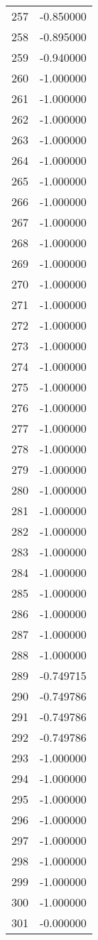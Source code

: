 \documentclass[12pt]{article}
\begin{document}
\begin{longtable}{@{}cc@{}}
257 & -0.850000 \\
258 & -0.895000 \\
259 & -0.940000 \\
260 & -1.000000 \\
261 & -1.000000 \\
262 & -1.000000 \\
263 & -1.000000 \\
264 & -1.000000 \\
265 & -1.000000 \\
266 & -1.000000 \\
267 & -1.000000 \\
268 & -1.000000 \\
269 & -1.000000 \\
270 & -1.000000 \\
271 & -1.000000 \\
272 & -1.000000 \\
273 & -1.000000 \\
274 & -1.000000 \\
275 & -1.000000 \\
276 & -1.000000 \\
277 & -1.000000 \\
278 & -1.000000 \\
279 & -1.000000 \\
280 & -1.000000 \\
281 & -1.000000 \\
282 & -1.000000 \\
283 & -1.000000 \\
284 & -1.000000 \\
285 & -1.000000 \\
286 & -1.000000 \\
287 & -1.000000 \\
288 & -1.000000 \\
289 & -0.749715 \\
290 & -0.749786 \\
291 & -0.749786 \\
292 & -0.749786 \\
293 & -1.000000 \\
294 & -1.000000 \\
295 & -1.000000 \\
296 & -1.000000 \\
297 & -1.000000 \\
298 & -1.000000 \\
299 & -1.000000 \\
300 & -1.000000 \\
301 & -0.000000 \\

\end{longtable}
\end{document}
